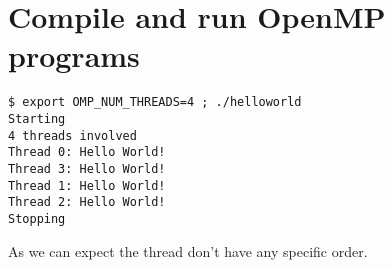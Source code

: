 \chapter{Compile and run OpenMP programs}

\begin{verbatim}
$ export OMP_NUM_THREADS=4 ; ./helloworld
Starting
4 threads involved
Thread 0: Hello World!
Thread 3: Hello World!
Thread 1: Hello World!
Thread 2: Hello World!
Stopping
\end{verbatim}

As we can expect the thread don't have any specific order.


